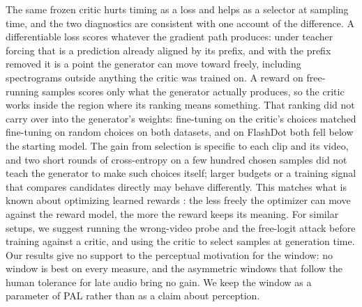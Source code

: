 The same frozen critic hurts timing as a loss and helps as a selector at sampling time, and the two diagnostics are consistent with one account of the difference. A differentiable loss scores whatever the gradient path produces: under teacher forcing that is a prediction already aligned by its prefix, and with the prefix removed it is a point the generator can move toward freely, including spectrograms outside anything the critic was trained on. A reward on free-running samples scores only what the generator actually produces, so the critic works inside the region where its ranking means something. That ranking did not carry over into the generator's weights: fine-tuning on the critic's choices matched fine-tuning on random choices on both datasets, and on FlashDot both fell below the starting model. The gain from selection is specific to each clip and its video, and two short rounds of cross-entropy on a few hundred chosen samples did not teach the generator to make such choices itself; larger budgets or a training signal that compares candidates directly may behave differently. This matches what is known about optimizing learned rewards \citep{gao2023scaling}: the less freely the optimizer can move against the reward model, the more the reward keeps its meaning. For similar setups, we suggest running the wrong-video probe and the free-logit attack before training against a critic, and using the critic to select samples at generation time. Our results give no support to the perceptual motivation for the window: no window is best on every measure, and the asymmetric windows that follow the human tolerance for late audio bring no gain. We keep the window as a parameter of PAL rather than as a claim about perception.
